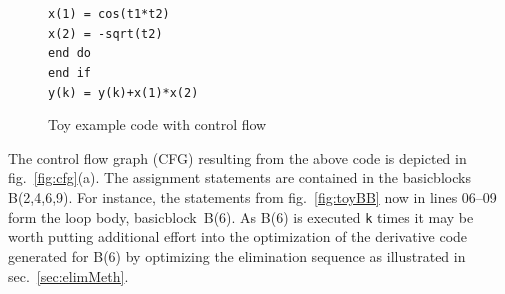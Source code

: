 \documentclass{book}
\newcommand{\basicblock}{basicblock}
\newcommand{\refsec}[1]{{sec.~\ref{#1}}}
\newcommand{\reffig}[1]{{fig.~\ref{#1}}}
\begin{document}
\begin{figure}
\begin{center}
\begin{minipage}{.5\textwidth}
\begin{tabbing}
        \hspace{.6cm}{\footnotesize \bf 08}\hspace{.5cm} \>\>\lstinline{x(1) = cos(t1*t2) } \\
        \hspace{.6cm}{\footnotesize \bf 09}\hspace{.5cm} \>\>\lstinline{x(2) = -sqrt(t2) } \\
        \hspace{.6cm}{\footnotesize \bf 10}\hspace{.5cm} \>\lstinline{end do } \\
        \hspace{.6cm}{\footnotesize \bf 11}\hspace{.5cm} \lstinline{end if } \\
        \hspace{.6cm}{\footnotesize \bf 12}\hspace{.5cm} \lstinline{y(k) = y(k)+x(1)*x(2) } 
      \end{tabbing}
    \end{minipage}
  \end{center}
  \caption{Toy example code with control flow}\label{fig:toy}
\end{figure}
The control flow graph (CFG) \cite{ASU86} resulting from the above code is depicted in 
\reffig{fig:cfg}(a).
The assignment statements are contained in the {\basicblock}s B(2,4,6,9).
For instance, 
the statements from \reffig{fig:toyBB} now  in lines 06--09 form the loop body, \basicblock\ B(6).
As B(6) is executed
\lstinline{k} times it may be worth putting
additional effort into the optimization of the derivative code 
generated for B(6) by optimizing the elimination sequence as illustrated in 
\refsec{sec:elimMeth}.
\end{document}
